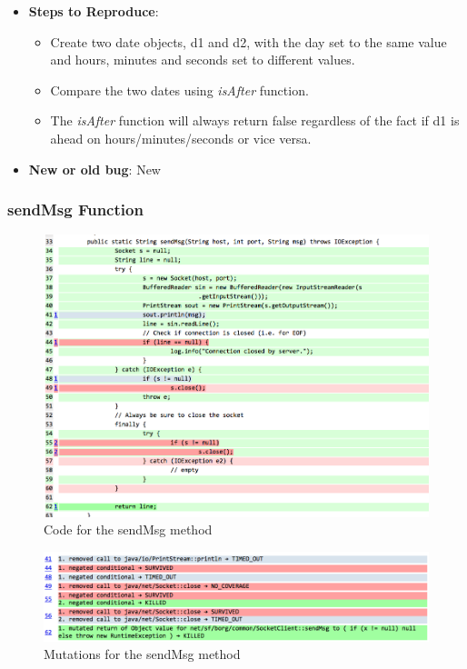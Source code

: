 \documentclass[fontsize=12pt,paper=letter,twoside]{scrartcl}
\begin{document}
\begin{itemize}
\item \textbf{Steps to Reproduce}:
\begin{itemize}
\item Create two date objects, d1 and d2, with the day set to the same value and hours, minutes and seconds set to different values.
\item Compare the two dates using \emph{isAfter} function.
\item The \emph{isAfter} function will always return false regardless of the fact if d1 is ahead on hours/minutes/seconds or vice versa.
\end{itemize}
\item \textbf{New or old bug}: New
\end{itemize}


\subsubsection{sendMsg Function}
\begin{figure}[!htb]
\begin{center}
\includegraphics[width=.99\textwidth]{images/MutationTesting/sendMsgCode.png}
\end{center}
\caption{Code for the sendMsg method}
\label{fig:sendMsgCode}
\end{figure}

\begin{figure}[!htb]
\begin{center}
\includegraphics[width=.99\textwidth]{images/MutationTesting/sendMsgMutant.png}
\end{center}
\caption{Mutations for the sendMsg method}
\label{fig:sendMsgMutant}
\end{figure}
\end{document}
